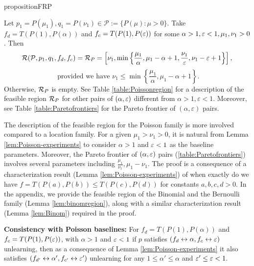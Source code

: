 \begin{restatable}{proposition}{FRP}
\label{thm:FRP}

Let $p_1 = P(\mu_1), q_1= P(\nu_1)\in \mathcal{P}:= \{P(\mu): \mu >0\}$. Take $f_d= T(P(1), P(\alpha))$ and $f_c= T(P(1), P(\varepsilon))$ for some $\alpha>1,\varepsilon<1, \mu_1, \nu_1 > 0$. Then  
\vspace{-2mm}
\begin{equation} \label{eq:FRP}
\mathcal{R}(\mathcal{P}, p_1,q_1,f_d,f_c)=\mathcal{R}_P= 
\left[ \nu_1 ,
\min\left\{
\frac{\mu_1}{\alpha},
\mu_1-\alpha+1, \frac{\nu_1}{\varepsilon},
\nu_1-\varepsilon+1
\right\}
\right],
\end{equation}
\begin{equation} \label{eq:FRPparameters0}
\text{ provided we have } \nu_1\leq \min\left\{
\frac{\mu_1}{\alpha},
\mu_1-\alpha+1
\right\}.
\end{equation}
Otherwise, $\mathcal{R}_{P}$ is empty.  See Table \ref{table:Poissonregion} for a description of the feasible region $\mathcal{R}_P$ for other pairs of  $(\alpha, \varepsilon)$ different from $\alpha >1,\varepsilon <1$. Moreover, see Table \ref{table:Paretofrontiers} for the Pareto frontier of $(\alpha, \varepsilon)$ pairs.
\end{restatable}
\begin{remark}[Intuition]
The description of the feasible region for the Poisson family is more involved compared to a location family. For a given $\mu_1 >\nu_1>0$, it is natural from Lemma \ref{lem:Poisson-experiments} to consider $\alpha >1$ and $\varepsilon <1$ as the baseline parameters. Moreover, the Pareto frontier of $(\alpha, \varepsilon)$ pairs (\ref{table:Paretofrontiers}) involves several  parameters including  $\frac{\mu_1}{\nu_1}, \mu_1- \nu_1$.  The proof is a consequence of a characterization result (Lemma \ref{lem:Poisson-experiments}) of when exactly do we have $f=T(P(a), P(b)) \leq T(P(c), P(d))$ for constants $a,b,c,d>0$.
In the appendix, we provide the feasible region of the Binomial and the Bernoulli family (Lemma \ref{lem:binomregion}), along with a similar characterization result (Lemma \ref{lem:Binom}) required in the proof.
\end{remark}
\vspace{-2mm}
\textbf{Consistency with Poisson baselines:}  For $f_d=T(P(1),P(\alpha))$ and  $f_c=T(P(1),P(\varepsilon))$, with $\alpha >1$ and $\varepsilon <1$ if $p$ satisfies $(f_d \leftrightarrow \alpha ,f_c \leftrightarrow \varepsilon)$ unlearning, then as a consequence of Lemma \ref{lem:Poisson-experiments} it also satisfies  $(f_{d'} \leftrightarrow \alpha' ,f_{c'} \leftrightarrow \varepsilon')$ unlearning for any $1\leq \alpha' \leq \alpha$ and $\varepsilon' \leq \varepsilon < 1$.

